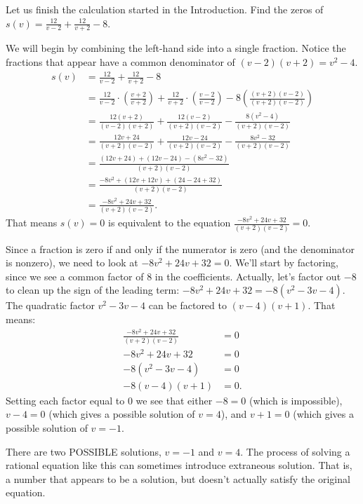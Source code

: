\documentclass[nooutcomes]{ximera}
\begin{document}
		
	\begin{example}

		Let us finish the calculation started in the Introduction. Find the zeros of $s(v) = \frac{12}{v-2}+\frac{12}{v+2}-8$. 
		
		\begin{explanation}
		
			We will begin by combining the left-hand side into a single fraction. Notice the fractions that appear
			have a common denominator of $(v-2)(v+2) = v^2 - 4$.
			\begin{align*}
				s(v) &= \frac{12}{v-2}+\frac{12}{v+2}-8 \\
					&= \frac{12}{v-2} \cdot \left(\frac{v+2}{v+2}\right)+\frac{12}{v+2}\cdot \left(\frac{v-2}{v-2}\right)-8\left(\frac{(v+2)(v-2)}{(v+2)(v-2)}\right) \\
					&= \frac{12(v+2)}{(v-2)(v+2)}+\frac{12(v-2)}{(v+2)(v-2)}-\frac{8(v^2-4)}{(v+2)(v-2)} \\
					&= \frac{12v+24}{(v+2)(v-2)}+\frac{12v-24}{(v+2)(v-2)}-\frac{8v^2-32}{(v+2)(v-2)} \\
					&= \frac{(12v+24)+(12v-24)-(8v^2-32)}{(v+2)(v-2)}\\
					&= \frac{-8v^2+(12v+12v)+(24-24+32)}{(v+2)(v-2)}\\
					&= \frac{-8v^2+24v+32}{(v+2)(v-2)}.
			\end{align*}
			That means $s(v) = 0$ is equivalent to the equation $\frac{-8v^2+24v+32}{(v+2)(v-2)} = 0$.
			
			Since a fraction is zero if and only if the numerator is zero (and the denominator is nonzero), we need to look at
			$-8v^2+24v+32 = 0$. We'll start by factoring, since we see a common factor of $8$ in the coefficients. Actually, let's factor out $-8$ to
			clean up the sign of the leading term: $-8v^2+24v+32 = -8( v^2 - 3v - 4 )$.  The quadratic factor $v^2-3v-4$ can be factored to
			$(v-4)(v+1)$. That means:
			\begin{align*}
				\frac{-8v^2+24v+32}{(v+2)(v-2)} &= 0 \\
				-8v^2+24v+32 &= 0\\
				-8(v^2-3v-4) &= 0\\
				-8(v-4)(v+1) &= 0.
			\end{align*}
			Setting each factor equal to $0$ we see that either $-8 = 0$ (which is impossible), $v-4=0$ (which gives a possible solution of $v=4$), and
			$v+1=0$ (which gives a possible solution of $v=-1$.
			
			There are two POSSIBLE solutions, $v=-1$ and $v=4$. The process of solving a rational equation like this can sometimes introduce 
			extraneous solution. That is, a number that appears to be a solution, but doesn't actually satisfy the original equation.
	

\end{explanation}
\end{example}
\end{document}

